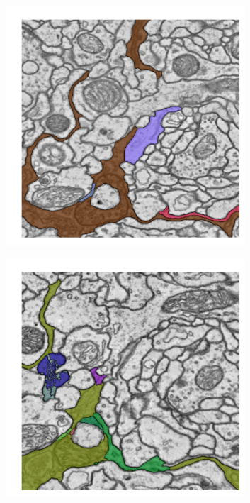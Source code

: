 \begin{figure}
    \begin{subfigure}[t]{0.46 \linewidth}
        \centering
        \includegraphics[width=0.98\textwidth]{figs/comparison/mean_F.pdf}
    \end{subfigure}%
    \begin{subfigure}[t]{0.46 \linewidth}
        \centering
        \includegraphics[width=0.98\textwidth]{figs/comparison/mean_T.pdf}
    \end{subfigure}\hspace{0.5cm}%


\end{figure}
